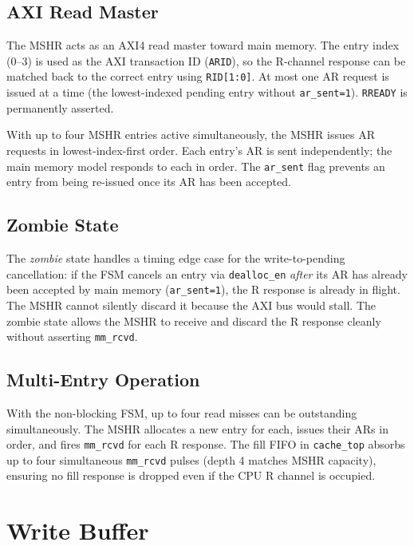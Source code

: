 \documentclass[12pt,letterpaper]{report}
\begin{document}
\subsection{AXI Read Master}

The MSHR acts as an AXI4 read master toward main memory.  The entry
index (0--3) is used as the AXI transaction ID (\texttt{ARID}), so
the R-channel response can be matched back to the correct entry using
\texttt{RID[1:0]}.  At most one AR request is issued at a time (the
lowest-indexed pending entry without \texttt{ar\_sent=1}).
\texttt{RREADY} is permanently asserted.

With up to four MSHR entries active simultaneously, the MSHR issues
AR requests in lowest-index-first order.  Each entry's AR is sent
independently; the main memory model responds to each in order.  The
\texttt{ar\_sent} flag prevents an entry from being re-issued once
its AR has been accepted.

\subsection{Zombie State}

The \emph{zombie} state handles a timing edge case for the write-to-pending
cancellation: if the FSM cancels an entry via \texttt{dealloc\_en}
\emph{after} its AR has already been accepted by main memory
(\texttt{ar\_sent=1}), the R response is already in flight.  The
MSHR cannot silently discard it because the AXI bus would stall.
The zombie state allows the MSHR to receive and discard the R response
cleanly without asserting \texttt{mm\_rcvd}.

\subsection{Multi-Entry Operation}

With the non-blocking FSM, up to four read misses can be outstanding
simultaneously.  The MSHR allocates a new entry for each, issues
their ARs in order, and fires \texttt{mm\_rcvd} for each R response.
The fill FIFO in \texttt{cache\_top} absorbs up to four simultaneous
\texttt{mm\_rcvd} pulses (depth 4 matches MSHR capacity), ensuring no
fill response is dropped even if the CPU R channel is occupied.

\section{Write Buffer}
\label{sec:wbuf}
\end{document}
